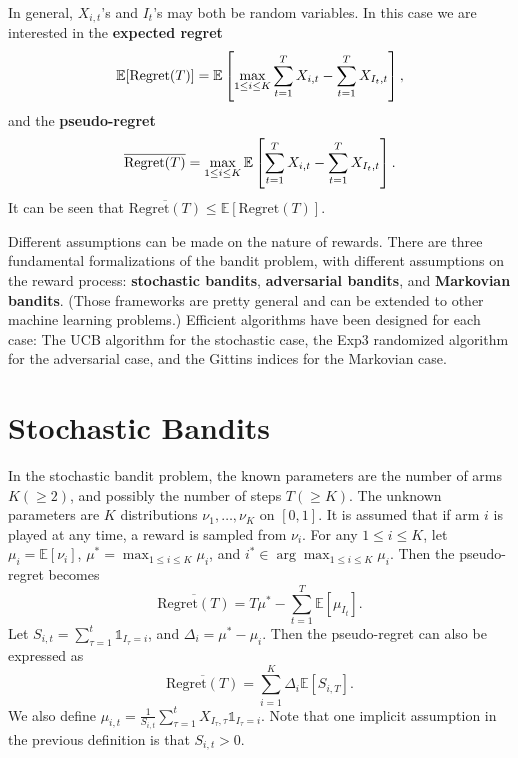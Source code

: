 \documentclass[openany]{book}
\theoremstyle{definition}
\theoremstyle{remark}
\begin{document}
In general, $X_{i,t}$'s and $I_t$'s may both be random variables. In this case we are interested in the \textbf{expected regret}
\begin{equation}\label{expectedRegret}
    \mathbb{E}[\mathrm{Regret}(T)]=\mathbb{E}\sbr{\max_{1\le i\le K}\sum_{t=1}^{T}X_{i,t}-\sum_{t=1}^{T}X_{I_t,t}},
\end{equation}
and the \textbf{pseudo-regret}
\begin{equation}\label{pseudoRegret}
    \overline{\mathrm{Regret}(T)}=\max_{1\le i\le K}\mathbb{E}\sbr{\sum_{t=1}^{T}X_{i,t}-\sum_{t=1}^{T}X_{I_t,t}}.
\end{equation}
It can be seen that $\overline{\mathrm{Regret}(T)}\le \mathbb{E}[\mathrm{Regret}(T)]$.

Different assumptions can be made on the nature of rewards. There are three fundamental formalizations of the bandit problem, with different assumptions on the reward process: \textbf{stochastic bandits}, \textbf{adversarial bandits}, and \textbf{Markovian bandits}. (Those frameworks are pretty general and can be extended to other machine learning problems.) Efficient algorithms have been designed for each case: The UCB algorithm for the stochastic case, the Exp3 randomized algorithm for the adversarial case, and the Gittins indices for the Markovian case.

\chapter{Stochastic Bandits}
In the stochastic bandit problem, the known parameters are the number of arms $K(\ge2)$, and possibly the number of steps $T(\ge K)$. The unknown parameters are $K$ distributions $\nu_1,\ldots,\nu_K$ on $[0,1]$. It is assumed that if arm $i$ is played at any time, a reward is sampled from $\nu_i$. For any $1\le i\le K$, let $\mu_i=\mathbb{E}[\nu_i]$, $\mu^*=\max_{1\le i\le K}\mu_i$, and $i^*\in\arg\max_{1\le i\le K}\mu_i$. Then the pseudo-regret becomes
\begin{equation}\label{stochPseudoRegret}
    \overline{\mathrm{Regret}(T)}=T\mu^*-\sum_{t=1}^{T}\mathbb{E}[\mu_{I_t}].
\end{equation}
Let $S_{i,t}=\sum_{\tau=1}^{t}\mathds{1}_{I_{\tau}=i}$, and $\Delta_i=\mu^*-\mu_i$. Then the pseudo-regret can also be expressed as
\begin{equation}\label{stochPseudoRegretAlt}
    \overline{\mathrm{Regret}(T)}=\sum_{i=1}^{K}\Delta_i \mathbb{E}[S_{i,T}].
\end{equation}
We also define $\mu_{i,t}=\frac{1}{S_{i,t}}\sum_{\tau=1}^{t}X_{I_{\tau},\tau}\mathds{1}_{I_{\tau}=i}$. Note that one implicit assumption in the previous definition is that $S_{i,t}>0$.
\end{document}
